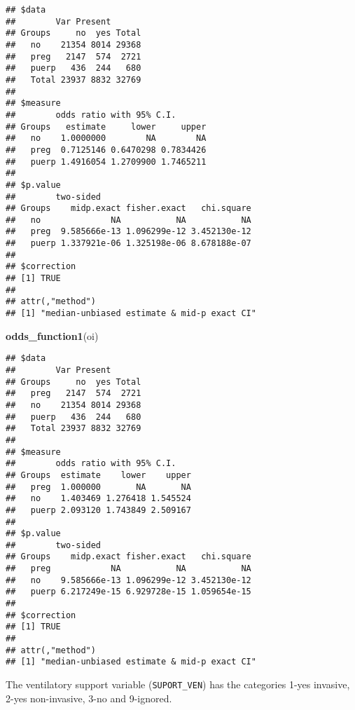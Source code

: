 \documentclass[
]{article}
\newenvironment{Shaded}{\begin{snugshade}}{\end{snugshade}}
\newcommand{\KeywordTok}[1]{\textcolor[rgb]{0.13,0.29,0.53}{\textbf{#1}}}
\newcommand{\NormalTok}[1]{#1}
\newcommand{\OperatorTok}[1]{\textcolor[rgb]{0.81,0.36,0.00}{\textbf{#1}}}
\newcommand{\StringTok}[1]{\textcolor[rgb]{0.31,0.60,0.02}{#1}}
\begin{document}
\begin{Shaded}
\end{Shaded}

\begin{verbatim}
## $data
##        Var Present
## Groups     no  yes Total
##   no    21354 8014 29368
##   preg   2147  574  2721
##   puerp   436  244   680
##   Total 23937 8832 32769
## 
## $measure
##        odds ratio with 95% C.I.
## Groups   estimate     lower     upper
##   no    1.0000000        NA        NA
##   preg  0.7125146 0.6470298 0.7834426
##   puerp 1.4916054 1.2709900 1.7465211
## 
## $p.value
##        two-sided
## Groups    midp.exact fisher.exact   chi.square
##   no              NA           NA           NA
##   preg  9.585666e-13 1.096299e-12 3.452130e-12
##   puerp 1.337921e-06 1.325198e-06 8.678188e-07
## 
## $correction
## [1] TRUE
## 
## attr(,"method")
## [1] "median-unbiased estimate & mid-p exact CI"
\end{verbatim}

\begin{Shaded}
\begin{Highlighting}[]
\KeywordTok{odds_function1}\NormalTok{(oi)}
\end{Highlighting}
\end{Shaded}

\begin{verbatim}
## $data
##        Var Present
## Groups     no  yes Total
##   preg   2147  574  2721
##   no    21354 8014 29368
##   puerp   436  244   680
##   Total 23937 8832 32769
## 
## $measure
##        odds ratio with 95% C.I.
## Groups  estimate    lower    upper
##   preg  1.000000       NA       NA
##   no    1.403469 1.276418 1.545524
##   puerp 2.093120 1.743849 2.509167
## 
## $p.value
##        two-sided
## Groups    midp.exact fisher.exact   chi.square
##   preg            NA           NA           NA
##   no    9.585666e-13 1.096299e-12 3.452130e-12
##   puerp 6.217249e-15 6.929728e-15 1.059654e-15
## 
## $correction
## [1] TRUE
## 
## attr(,"method")
## [1] "median-unbiased estimate & mid-p exact CI"
\end{verbatim}

The ventilatory support variable (\texttt{SUPORT\_VEN}) has the
categories 1-yes invasive, 2-yes non-invasive, 3-no and 9-ignored.
\end{document}
